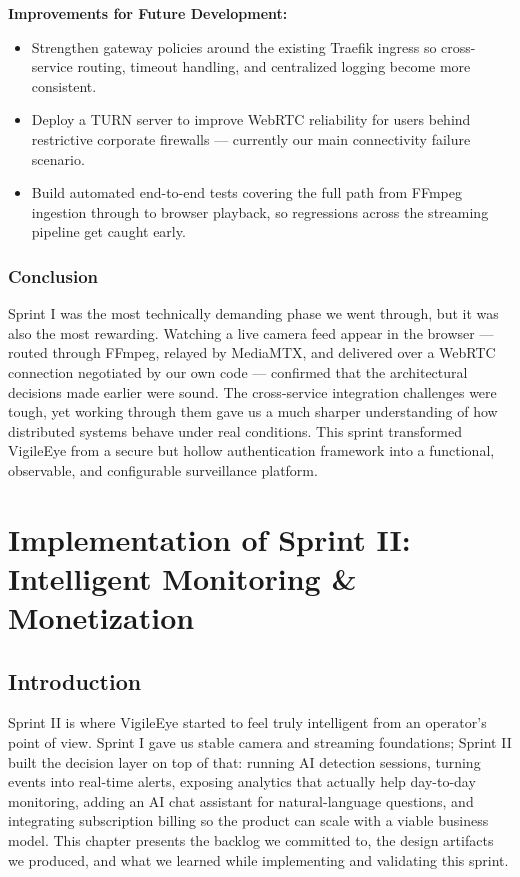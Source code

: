 \documentclass[12pt,a4paper,oneside]{report}
\begin{document}
\textbf{Improvements for Future Development:}
\begin{itemize}
  \item Strengthen gateway policies around the existing Traefik ingress so cross-service routing, timeout handling, and centralized logging become more consistent.
  \item Deploy a TURN server to improve WebRTC reliability for users behind restrictive corporate firewalls — currently our main connectivity failure scenario.
  \item Build automated end-to-end tests covering the full path from FFmpeg ingestion through to browser playback, so regressions across the streaming pipeline get caught early.
\end{itemize}

\subsection*{Conclusion}

\enlargethispage{10\baselineskip}
\hspace{0.8cm}Sprint I was the most technically demanding phase we went through, but it was also the most rewarding. Watching a live camera feed appear in the browser — routed through FFmpeg, relayed by MediaMTX, and delivered over a WebRTC connection negotiated by our own code — confirmed that the architectural decisions made earlier were sound. The cross-service integration challenges were tough, yet working through them gave us a much sharper understanding of how distributed systems behave under real conditions. This sprint transformed VigileEye from a secure but hollow authentication framework into a functional, observable, and configurable surveillance platform.


\chapter{Implementation of Sprint II: Intelligent Monitoring \& Monetization}
\label{chap:sprint2}

\section{Introduction}
\label{sec:s2_intro}

\hspace{0.8cm}Sprint II is where VigileEye started to feel truly intelligent from an operator's point of view. Sprint I gave us stable camera and streaming foundations; Sprint II built the decision layer on top of that: running AI detection sessions, turning events into real-time alerts, exposing analytics that actually help day-to-day monitoring, adding an AI chat assistant for natural-language questions, and integrating subscription billing so the product can scale with a viable business model. This chapter presents the backlog we committed to, the design artifacts we produced, and what we learned while implementing and validating this sprint.
\end{document}
